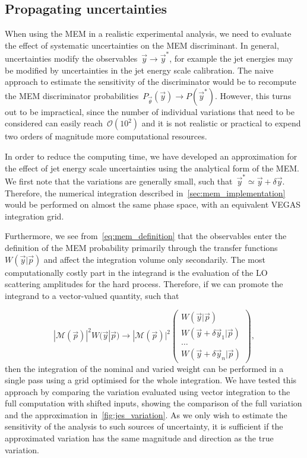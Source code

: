 \subsection{Propagating uncertainties}
\label{sec:mem_uncertainties}

When using the MEM in a realistic experimental analysis, we need to evaluate the effect of systematic uncertainties on the MEM discriminant. In general, uncertainties modify the observables~$\vec{y} \rightarrow \vec{y}^*$, for example the jet energies may be modified by uncertainties in the jet energy scale calibration. The naive approach to estimate the sensitivity of the discriminator would be to recompute the MEM discriminator probabilities~$P_{\vec{\theta}}(\vec{y}) \rightarrow P(\vec{y}^*)$. However, this turns out to be impractical, since the number of individual variations that need to be considered can easily reach~$\mathcal{O}(10^2)$ and it is not realistic or practical to expend two orders of magnitude more computational resources.

In order to reduce the computing time, we have developed an approximation for the effect of jet energy scale uncertainties using the analytical form of the MEM. We first note that the variations are generally small, such that~$\vec{y}^* \simeq \vec{y} + \delta \vec{y}$. Therefore, the numerical integration described in~\cref{sec:mem_implementation} would be performed on almost the same phase space, with an equivalent VEGAS integration grid.

Furthermore, we see from~\cref{eq:mem_definition} that the observables enter the definition of the MEM probability primarily through the transfer functions~$W(\vec{y} | \vec{p})$ and affect the integration volume only secondarily. The most computationally costly part in the integrand is the evaluation of the LO scattering amplitudes for the hard process. Therefore, if we can promote the integrand to a vector-valued quantity, such that

\begin{equation}
|\mathcal{M}(\vec{p})|^2 W(\vec{y} | \vec{p}) \rightarrow |\mathcal{M}(\vec{p})|^2  \begin{pmatrix}
  W(\vec{y} | \vec{p}) \\
  W(\vec{y} + \delta \vec{y}_1 | \vec{p}) \\
  \dots \\
  W(\vec{y} + \delta \vec{y}_n | \vec{p})
 \end{pmatrix},
\end{equation}
then the integration of the nominal and varied weight can be performed in a single pass using a grid optimised for the whole integration. We have tested this approach by comparing the variation evaluated using vector integration to the full computation with shifted inputs, showing the comparison of the full variation and the approximation in~\cref{fig:jes_variation}. As we only wish to estimate the sensitivity of the analysis to such sources of uncertainty, it is sufficient if the approximated variation has the same magnitude and direction as the true variation.

